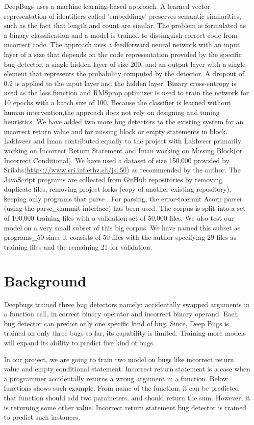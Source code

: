 \documentclass[sigconf]{acmart}
\begin{document}
\newline DeepBugs uses a machine learning-based approach. A learned vector representation of identifiers called 'embeddings' preserves semantic similarities, such as the fact that length and count are similar.  The problem is formulated as a binary classification and a model is trained to distinguish correct code from incorrect code. 
\newline The approach uses a feedforward neural network with an input layer of a size that depends on the code representation provided by the specific bug detector, a single hidden layer of size 200, and an output layer with a single element that represents the probability computed by the detector. A dropout of 0.2 is applied to the input layer and the hidden layer. Binary cross-entropy is used as the loss function and RMSprop optimizer is used to train the network for 10 epochs with a batch size of 100.
\newline Because the classifier is learned without human intervention,the approach does not rely on designing and tuning heuristics. We have added two more bug detectors to the existing system for an incorrect return value and for missing block or empty statements in block. Lakhveer and Iman contributed equally to the project with Lakhveer primarily working on Incorrect Return Statement and Iman working on Missing Block(or Incorrect Conditional). We have used a dataset of size 150,000 provided by Srilabs(\underline{\href{https://www.sri.inf.ethz.ch/js150}{https://www.sri.inf.ethz.ch/js150}}) as recommended by the author. The JavaScript programs are collected from GitHub repositories by removing duplicate files, removing project forks (copy of another existing repository), keeping only programs that parse . For parsing, the error-tolerant Acorn parser (using the parse\_dammit interface) has been used. The corpus is split into a set of 100,000 training files with a validation set of 50,000 files. We also test our model on a very small subset of this big corpus. We have named this subset as programs\_50 since it consists of 50 files with the author specifying 29 files as training files and the remaining 21 for validation.

\section{Background}
Deepbugs trained three bug detectors namely: accidentally swapped arguments in a function call, in correct binary operator and incorrect binary operand. Each bug detector can predict only one specific kind of bug. Since, Deep Bugs is trained on only three bugs so far, its capability is limited. Training more models will expand its ability to predict five kind of bugs.  
\par
In our project, we are going to train two model on bugs like incorrect return value and empty conditional statement. Incorrect return statement is a case when a programmer accidentally returns a wrong argument in a function. Below functions shows such example. From name of the function, it can be predicted that function should add two parameters, and should return the sum. However, it is returning some other value. Incorrect return statement bug detector is trained to predict such instances. 
\end{document}
